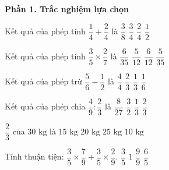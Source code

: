 \textbf{Phần 1. Trắc nghiệm lựa chọn}

\begin{ex} %
Kết quả của phép tính $\dfrac{1}{4} + \dfrac{2}{4}$ là
\choice
{$\dfrac{3}{8}$}
{\True $\dfrac{3}{4}$}
{$\dfrac{2}{4}$}
{$\dfrac{1}{2}$}
\end{ex}

\begin{ex} %
Kết quả của phép tính $\dfrac{3}{5} \times \dfrac{2}{7}$ là
\choice
{\True $\dfrac{6}{35}$}
{$\dfrac{5}{12}$}
{$\dfrac{6}{12}$}
{$\dfrac{5}{35}$}
\end{ex}

\begin{ex} %
Kết quả của phép trừ $\dfrac{5}{6} - \dfrac{1}{2}$ là
\choice
{$\dfrac{4}{4}$}
{$\dfrac{2}{3}$}
{\True $\dfrac{1}{3}$}
{$\dfrac{1}{6}$}
\end{ex}

\begin{ex} %
Kết quả của phép chia $\dfrac{4}{9} : \dfrac{2}{3}$ là
\choice
{$\dfrac{8}{27}$}
{$\dfrac{3}{2}$}
{$\dfrac{1}{3}$}
{\True $\dfrac{2}{3}$}
\end{ex}

\begin{ex} %
$\dfrac{2}{3}$ của $30\text{ kg}$ là
\choice
{$15\text{ kg}$}
{\True $20\text{ kg}$}
{$25\text{ kg}$}
{$10\text{ kg}$}
\end{ex}

\begin{ex} %
Tính thuận tiện: $\dfrac{3}{5} \times \dfrac{7}{9} + \dfrac{3}{5} \times \dfrac{2}{9}$.
\choice
{\True $\dfrac{3}{5}$}
{$1$}
{$\dfrac{9}{9}$}
{$\dfrac{6}{5}$}
\end{ex}

